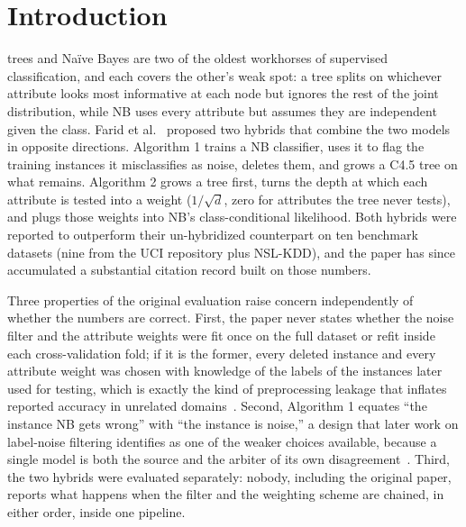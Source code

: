 \section{Introduction}

 trees and Na\"ive Bayes are two of the oldest
workhorses of supervised classification, and each covers the other's
weak spot: a tree splits on whichever attribute looks most informative at
each node but ignores the rest of the joint distribution, while NB uses
every attribute but assumes they are independent given the class. Farid
et al.~\cite{farid2014hybrid} proposed two hybrids that combine the two
models in opposite directions. Algorithm 1 trains a NB classifier, uses it
to flag the training instances it misclassifies as noise, deletes them,
and grows a C4.5 tree on what remains. Algorithm 2 grows a tree first,
turns the depth at which each attribute is tested into a weight
($1/\sqrt{d}$, zero for attributes the tree never tests), and plugs those
weights into NB's class-conditional likelihood. Both hybrids were reported
to outperform their un-hybridized counterpart on ten benchmark
datasets (nine from the UCI repository plus NSL-KDD), and the paper has since accumulated a substantial citation
record built on those numbers.

Three properties of the original evaluation raise concern independently
of whether the numbers are correct. First, the paper never states whether
the noise filter and the attribute weights were fit once on the full
dataset or refit inside each cross-validation fold; if it is the former,
every deleted instance and every attribute weight was chosen with
knowledge of the labels of the instances later used for testing, which is
exactly the kind of preprocessing leakage that inflates reported accuracy
in unrelated
domains~\cite{cawley2010overfitting,demircioglu2021measuring,kapoor2023leakage,bouke2023empirical}.
Second, Algorithm 1 equates ``the instance NB gets wrong'' with ``the
instance is noise,'' a design that later work on label-noise filtering
identifies as one of the weaker choices available, because a single model
is both the source and the arbiter of its own
disagreement~\cite{brodley1999identifying,jiang2024correction,northcutt2021confident}.
Third, the two hybrids were evaluated separately: nobody, including the
original paper, reports what happens when the filter and the weighting
scheme are chained, in either order, inside one pipeline.

